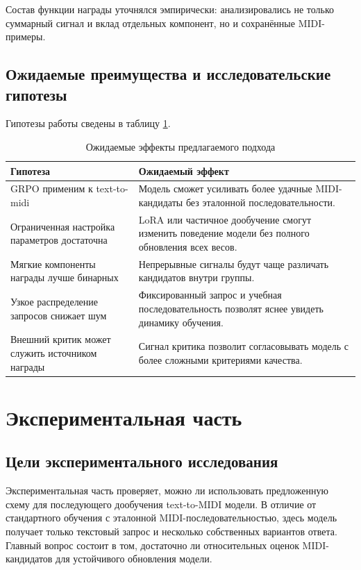 \documentclass[a4paper,12pt]{extarticle}
\begin{document}
Состав функции награды уточнялся эмпирически: анализировались не только
суммарный сигнал и вклад отдельных компонент, но и сохранённые MIDI-примеры.

\subsection{Ожидаемые преимущества и исследовательские гипотезы}

Гипотезы работы сведены в таблицу \ref{tab:approach_hypotheses}.

\begin{table}[ht]
\centering
\caption{Ожидаемые эффекты предлагаемого подхода}
\label{tab:approach_hypotheses}
\begin{tabular}{|p{}|p{}|}
\hline
\textbf{Гипотеза} & \textbf{Ожидаемый эффект} \\
\hline
GRPO применим к text-to-midi & Модель сможет усиливать более удачные MIDI-кандидаты без эталонной последовательности. \\
\hline
Ограниченная настройка параметров достаточна & LoRA или частичное дообучение смогут изменить поведение модели без полного обновления всех весов. \\
\hline
Мягкие компоненты награды лучше бинарных & Непрерывные сигналы будут чаще различать кандидатов внутри группы. \\
\hline
Узкое распределение запросов снижает шум & Фиксированный запрос и учебная последовательность позволят яснее увидеть динамику обучения. \\
\hline
Внешний критик может служить источником награды & Сигнал критика позволит согласовывать модель с более сложными критериями качества. \\
\hline
\end{tabular}
\end{table}

\section{Экспериментальная часть}

\subsection{Цели экспериментального исследования}

Экспериментальная часть проверяет, можно ли использовать предложенную схему
для последующего дообучения text-to-MIDI модели. В отличие от стандартного
обучения с эталонной MIDI-последовательностью, здесь модель получает только
текстовый запрос и несколько собственных вариантов ответа. Главный вопрос
состоит в том, достаточно ли относительных оценок MIDI-кандидатов для
устойчивого обновления модели.
\end{document}
